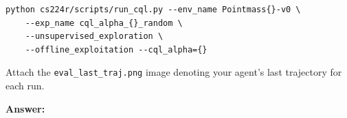 \documentclass[12pt]{article}
\newcommand{\answer}[1]{{\bf \color{red}Answer:\\ #1}}
\begin{document}
\begin{enumerate}
\begin{tcolorbox}[width=\linewidth, sharp corners=all, colback=white!95!black]
\begin{verbatim}
python cs224r/scripts/run_cql.py --env_name Pointmass{}-v0 \
    --exp_name cql_alpha_{}_random \
    --unsupervised_exploration \
    --offline_exploitation --cql_alpha={}
\end{verbatim}
\end{tcolorbox}


Attach the \texttt{eval\_last\_traj.png} image denoting your agent's last trajectory for each run.




\answer{}
\end{enumerate}
\end{document}
